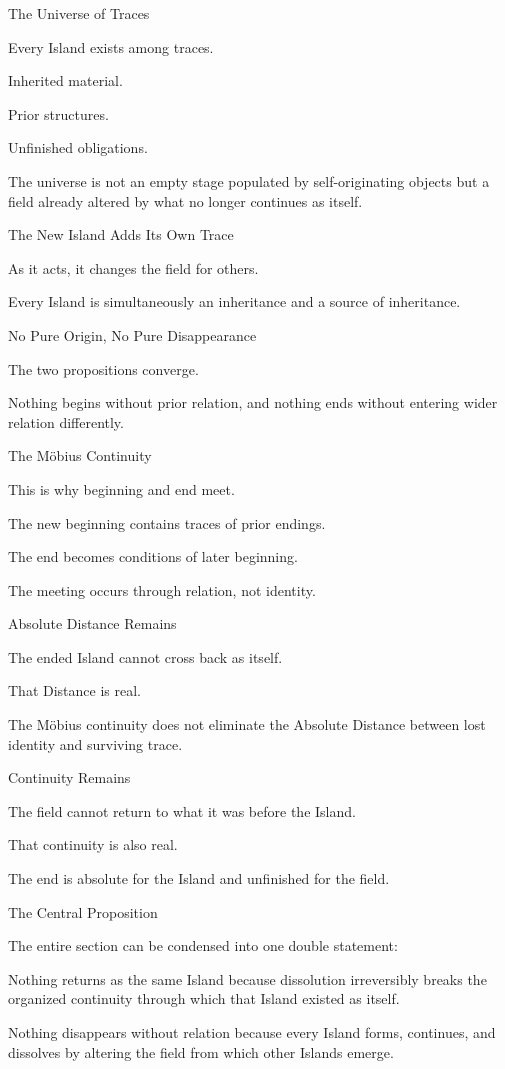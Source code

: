 The Universe of Traces

Every Island exists among traces.

Inherited material.

Prior structures.

Unfinished obligations.

The universe is not an empty stage populated by self-originating objects but a field already altered by what no longer continues as itself.

The New Island Adds Its Own Trace

As it acts, it changes the field for others.

Every Island is simultaneously an inheritance and a source of inheritance.

No Pure Origin, No Pure Disappearance

The two propositions converge.

Nothing begins without prior relation, and nothing ends without entering wider relation differently.

The Möbius Continuity

This is why beginning and end meet.

The new beginning contains traces of prior endings.

The end becomes conditions of later beginning.

The meeting occurs through relation, not identity.

Absolute Distance Remains

The ended Island cannot cross back as itself.

That Distance is real.

The Möbius continuity does not eliminate the Absolute Distance between lost identity and surviving trace.

Continuity Remains

The field cannot return to what it was before the Island.

That continuity is also real.

The end is absolute for the Island and unfinished for the field.

The Central Proposition

The entire section can be condensed into one double statement:

Nothing returns as the same Island because dissolution irreversibly breaks the organized continuity through which that Island existed as itself.

Nothing disappears without relation because every Island forms, continues, and dissolves by altering the field from which other Islands emerge.

